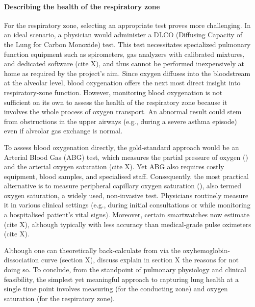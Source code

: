 \paragraph{Describing the health of the respiratory zone}
For the respiratory zone, selecting an appropriate test proves more challenging. In an ideal scenario, a physician would administer a DLCO (Diffusing Capacity of the Lung for Carbon Monoxide) test. This test necessitates specialized pulmonary function equipment such as spirometers, gas analyzers with calibrated mixtures, and dedicated software (cite X), and thus cannot be performed inexpensively at home as required by the project's aim. Since oxygen diffuses into the bloodstream at the alveolar level, blood oxygenation offers the next most direct insight into respiratory-zone function. However, monitoring blood oxygenation is not sufficient on its own to assess the health of the respiratory zone because it involves the whole process of oxygen transport. An abnormal result could stem from obstructions in the upper airways (e.g., during a severe asthma episode) even if alveolar gas exchange is normal.

To assess blood oxygenation directly, the gold-standard approach would be an Arterial Blood Gas (ABG) test, which measures the partial pressure of oxygen (\PA) and the arterial oxygen saturation (cite X). Yet ABG also requires costly equipment, blood samples, and specialised staff. Consequently, the most practical alternative is to measure peripheral capillary oxygen saturation (\SP), also termed oxygen saturation, a widely used, non-invasive test. Physicians routinely measure it in various clinical settings (e.g., during initial consultations or while monitoring a hospitalised patient’s vital signs). Moreover, certain smartwatches now estimate \SP (cite X), although typically with less accuracy than medical-grade pulse oximeters (cite X).

Although one can theoretically back-calculate \PA from \SP via the oxyhemoglobin-dissociation curve (section X), discuss explain in section X the reasons for not doing so. To conclude, from the standpoint of pulmonary physiology and clinical feasibility, the simplest yet meaningful approach to capturing lung health at a single time point involves measuring \F (for the conducting zone) and oxygen saturation (for the respiratory zone).


